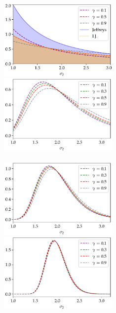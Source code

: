 \begin{figure}[h]%
    \centering%
    \includegraphics[width=5.8cm]{figures/constrained-priors/priors_.pdf}\hspace*{1cm}%
    \includegraphics[width=5.8cm]{figures/constrained-priors/post5.pdf}\\
    \\[5pt]
    \includegraphics[width=5.8cm]{figures/constrained-priors/post15.pdf}\hspace*{1cm}%
    \includegraphics[width=5.8cm]{figures/constrained-priors/post50.pdf}\\

\end{figure}
